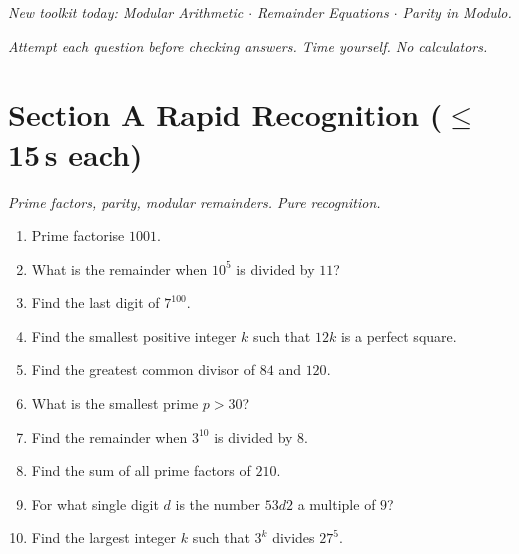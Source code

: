 \documentclass[11pt,a4paper]{article}
\begin{document}
\noindent\textit{New toolkit today: Modular Arithmetic $\cdot$ Remainder Equations $\cdot$ Parity in Modulo.}

\vspace{2pt}
\noindent\textit{Attempt each question before checking answers. Time yourself. No calculators.}

\section*{Section A \quad Rapid Recognition \hfill{\normalfont\small($\leq$15\,s each)}}

\noindent\textit{Prime factors, parity, modular remainders. Pure recognition.}

\begin{enumerate}

\item Prime factorise $1001$.

\item What is the remainder when $10^5$ is divided by $11$?

\item Find the last digit of $7^{100}$.

\item Find the smallest positive integer $k$ such that $12k$ is a perfect square.

\item Find the greatest common divisor of $84$ and $120$.

\item What is the smallest prime $p > 30$?

\item Find the remainder when $3^{10}$ is divided by $8$.

\item Find the sum of all prime factors of $210$.

\item For what single digit $d$ is the number $53d2$ a multiple of $9$?

\item Find the largest integer $k$ such that $3^k$ divides $27^5$.

\end{enumerate}

\end{document}
